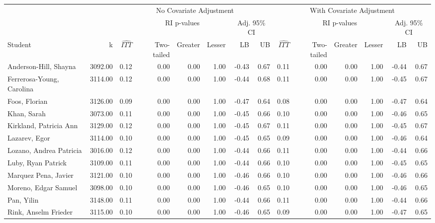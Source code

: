 \documentclass[11pt,notitlepage]{article}
\begin{document}
\begin{table}[h!]\scriptsize\onehalfspacing
\begin{center}
\begin{tabular}{lrrrrrrr|rrrrrr}
  \hline
  & & \multicolumn{6}{c|}{No Covariate Adjustment} & \multicolumn{6}{c}{With Covariate Adjustment} \\
  \cline{3-14}
  & & & \multicolumn{3}{c}{RI p-values} & \multicolumn{2}{c|}{Adj. 95\% CI} &  & \multicolumn{3}{c}{RI p-values} & \multicolumn{2}{c}{Adj. 95\% CI} \\
  \cline{4-6}\cline{10-12}
Student & k & $\widehat{ITT}$ & Two-tailed & Greater & Lesser & LB & UB & $\widehat{ITT}$ & Two-tailed & Greater & Lesser & LB & UB \\ 
  \hline
Anderson-Hill, Shayna & 3092.00 & 0.12 & 0.00 & 0.00 & 1.00 & -0.43 & 0.67 & 0.11 & 0.00 & 0.00 & 1.00 & -0.44 & 0.67 \\ 
  Ferrerosa-Young, Carolina & 3114.00 & 0.12 & 0.00 & 0.00 & 1.00 & -0.44 & 0.68 & 0.11 & 0.00 & 0.00 & 1.00 & -0.45 & 0.67 \\ 
  Foos, Florian & 3126.00 & 0.09 & 0.00 & 0.00 & 1.00 & -0.47 & 0.64 & 0.08 & 0.00 & 0.00 & 1.00 & -0.47 & 0.64 \\ 
  Khan, Sarah & 3073.00 & 0.11 & 0.00 & 0.00 & 1.00 & -0.45 & 0.66 & 0.10 & 0.00 & 0.00 & 1.00 & -0.46 & 0.65 \\ 
  Kirkland, Patricia Ann & 3129.00 & 0.12 & 0.00 & 0.00 & 1.00 & -0.45 & 0.67 & 0.11 & 0.00 & 0.00 & 1.00 & -0.45 & 0.67 \\ 
  Lazarev, Egor & 3114.00 & 0.10 & 0.00 & 0.00 & 1.00 & -0.45 & 0.65 & 0.09 & 0.00 & 0.00 & 1.00 & -0.46 & 0.64 \\ 
  Lozano, Andrea Patricia & 3016.00 & 0.12 & 0.00 & 0.00 & 1.00 & -0.44 & 0.66 & 0.11 & 0.00 & 0.00 & 1.00 & -0.44 & 0.66 \\ 
  Luby, Ryan Patrick & 3109.00 & 0.11 & 0.00 & 0.00 & 1.00 & -0.44 & 0.66 & 0.10 & 0.00 & 0.00 & 1.00 & -0.45 & 0.65 \\ 
  Marquez Pena, Javier & 3121.00 & 0.10 & 0.00 & 0.00 & 1.00 & -0.46 & 0.66 & 0.10 & 0.00 & 0.00 & 1.00 & -0.46 & 0.66 \\ 
  Moreno, Edgar Samuel & 3098.00 & 0.10 & 0.00 & 0.00 & 1.00 & -0.46 & 0.65 & 0.10 & 0.00 & 0.00 & 1.00 & -0.46 & 0.65 \\ 
  Pan, Yilin & 3148.00 & 0.11 & 0.00 & 0.00 & 1.00 & -0.44 & 0.66 & 0.11 & 0.00 & 0.00 & 1.00 & -0.44 & 0.66 \\ 
  Rink, Anselm Frieder & 3115.00 & 0.10 & 0.00 & 0.00 & 1.00 & -0.46 & 0.65 & 0.09 & 0.00 & 0.00 & 1.00 & -0.47 & 0.65 \\ 

\end{tabular}
\end{center}
\end{table}
\end{document}
